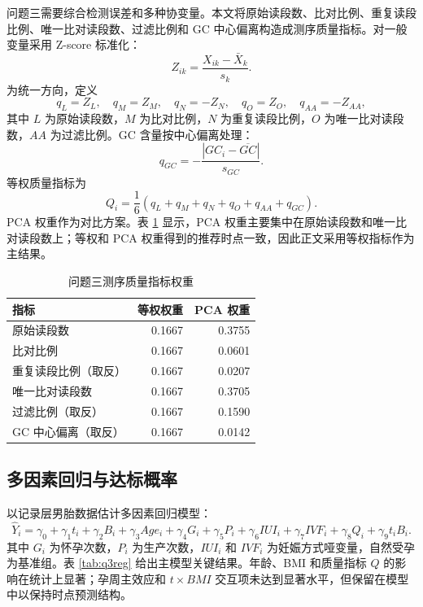 \documentclass[UTF8,zihao=-4]{ctexart}
\numberwithin{equation}{section}
\begin{document}
问题三需要综合检测误差和多种协变量。本文将原始读段数、比对比例、重复读段比例、唯一比对读段数、过滤比例和 GC 中心偏离构造成测序质量指标。对一般变量采用 Z-score 标准化：
\begin{equation}
Z_{ik}=\frac{X_{ik}-\bar{X}_k}{s_k}.
\end{equation}
为统一方向，定义
\begin{equation}
q_L=Z_L,\quad q_M=Z_M,\quad q_N=-Z_N,\quad q_O=Z_O,\quad q_{AA}=-Z_{AA},
\end{equation}
其中 $L$ 为原始读段数，$M$ 为比对比例，$N$ 为重复读段比例，$O$ 为唯一比对读段数，$AA$ 为过滤比例。GC 含量按中心偏离处理：
\begin{equation}
q_{GC}=-\frac{|GC_i-\overline{GC}|}{s_{GC}}.
\end{equation}
等权质量指标为
\begin{equation}
Q_i=\frac{1}{6}(q_L+q_M+q_N+q_O+q_{AA}+q_{GC}).
\end{equation}
PCA 权重作为对比方案\cite{jolliffe2002}。表 \ref{tab:q3weight} 显示，PCA 权重主要集中在原始读段数和唯一比对读段数上；等权和 PCA 权重得到的推荐时点一致，因此正文采用等权指标作为主结果。

\begin{table}[H]
\centering
\caption{问题三测序质量指标权重}
\label{tab:q3weight}
\begin{tabular}{lrr}
\toprule
指标 & 等权权重 & PCA 权重 \\
\midrule
原始读段数 & 0.1667 & 0.3755 \\
比对比例 & 0.1667 & 0.0601 \\
重复读段比例（取反） & 0.1667 & 0.0207 \\
唯一比对读段数 & 0.1667 & 0.3705 \\
过滤比例（取反） & 0.1667 & 0.1590 \\
GC 中心偏离（取反） & 0.1667 & 0.0142 \\
\bottomrule
\end{tabular}
\end{table}

\subsection{多因素回归与达标概率}

以记录层男胎数据估计多因素回归模型：
\begin{equation}
\hat{Y}_i=\gamma_0+\gamma_1t_i+\gamma_2B_i+\gamma_3Age_i+\gamma_4G_i+\gamma_5P_i
+\gamma_6IUI_i+\gamma_7IVF_i+\gamma_8Q_i+\gamma_9t_iB_i.
\end{equation}
其中 $G_i$ 为怀孕次数，$P_i$ 为生产次数，$IUI_i$ 和 $IVF_i$ 为妊娠方式哑变量，自然受孕为基准组。表 \ref{tab:q3reg} 给出主模型关键结果。年龄、BMI 和质量指标 $Q$ 的影响在统计上显著；孕周主效应和 $t\times BMI$ 交互项未达到显著水平，但保留在模型中以保持时点预测结构。
\end{document}
